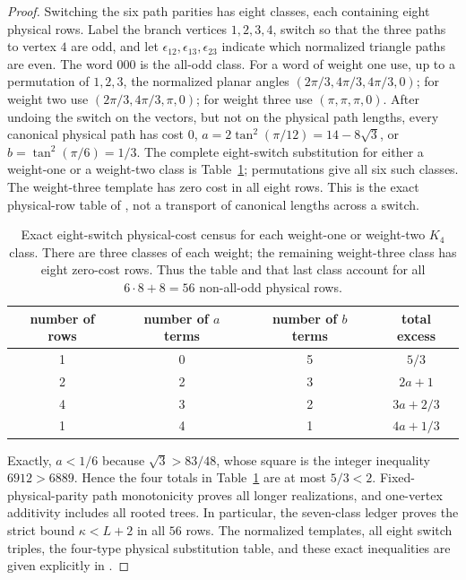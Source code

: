 \documentclass[11pt]{article}
\theoremstyle{remark}
\begin{document}
\begin{proof}
Switching the six path parities has eight classes, each containing eight
physical rows.  Label the branch vertices $1,2,3,4$, switch so that the three
paths to vertex $4$ are odd, and let $\epsilon_{12},\epsilon_{13},
\epsilon_{23}$ indicate which normalized triangle paths are even.  The word
$000$ is the all-odd class.  For a word of weight one use, up to a permutation
of $1,2,3$, the normalized planar angles
$(2\pi/3,4\pi/3,4\pi/3,0)$; for weight two use
$(2\pi/3,4\pi/3,\pi,0)$; for weight three use $(\pi,\pi,\pi,0)$.
After undoing the switch on the vectors, but not on the physical path lengths,
every canonical physical path has cost $0$, $a=2\tan^2(\pi/12)=14-8\sqrt3$,
or $b=\tan^2(\pi/6)=1/3$.  The complete eight-switch substitution for either
a weight-one or a weight-two class is Table~\ref{tab:k4}; permutations give
all six such classes.  The weight-three template has zero cost in all eight
rows.  This is the exact physical-row table of \cite{K4Seven}, not a transport
of canonical lengths across a switch.

\begin{table}[ht]
\centering\small
\begin{tabular}{cccc}
\toprule
number of rows&number of $a$ terms&number of $b$ terms&total excess\\
\midrule
1&0&5&$5/3$\\
2&2&3&$2a+1$\\
4&3&2&$3a+2/3$\\
1&4&1&$4a+1/3$\\
\bottomrule
\end{tabular}
\caption{Exact eight-switch physical-cost census for each weight-one or
weight-two $K_4$ class.  There are three classes of each weight; the remaining
weight-three class has eight zero-cost rows.  Thus the table and that last
class account for all $6\cdot8+8=56$ non-all-odd physical rows.}
\label{tab:k4}
\end{table}

Exactly, $a<1/6$ because $\sqrt3>83/48$, whose square is the integer
inequality $6912>6889$.  Hence the four totals in Table~\ref{tab:k4} are at
most $5/3<2$.  Fixed-physical-parity path monotonicity proves all longer
realizations, and one-vertex additivity includes all rooted trees.  In
particular, the seven-class ledger proves the strict bound $\kappa<L+2$ in
all $56$ rows.  The normalized templates, all eight switch triples, the
four-type physical substitution table, and these exact inequalities are
given explicitly in \cite{K4Seven}.


\end{proof}
\end{document}
